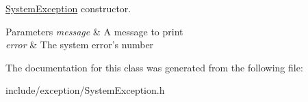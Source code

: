 \hyperlink{class_f_t_p_1_1_system_exception}{System\-Exception} constructor. 


\begin{DoxyParams}{Parameters}
{\em message} & A message to print \\
\hline
{\em error} & The system error's number \\
\hline
\end{DoxyParams}


The documentation for this class was generated from the following file\-:\begin{DoxyCompactItemize}
\item 
include/exception/System\-Exception.\-h\end{DoxyCompactItemize}
